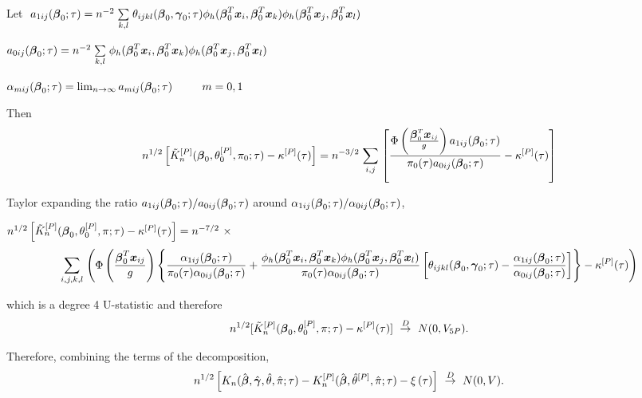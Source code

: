\documentclass[12pt]{article}
\newcommand{\bmx}{\mbox{\boldmath $x$}}
\newcommand{\bg}{\mbox{\boldmath $\gamma$}}
\newcommand{\bb}{\mbox{\boldmath $\beta$}}
\def\stackunder#1#2{\mathrel{\mathop{#2}\limits_{#1}}}
\begin{document}
\bigskip

\noindent \hspace{0.50in} Let $ \ a_{1ij}(\bb_0;\tau) = n^{-2} \stackunder{k, l}{\sum} \theta_{ijkl}(\bb_0,\bg_0;\tau) \phi_h(\bb_0^T\bmx_{i},\bb_0^T\bmx_{k}) \phi_h(\bb_0^T\bmx_{j},\bb_0^T\bmx_{l})$

\noindent \hspace{0.85in}  $a_{0ij}(\bb_0;\tau) = n^{-2} \stackunder{k, l}{\sum} \phi_h(\bb_0^T\bmx_{i},\bb_0^T\bmx_{k}) \phi_h(\bb_0^T\bmx_{j},\bb_0^T\bmx_{l}) $

\noindent \hspace{0.85in}  $\alpha_{mij}(\bb_0;\tau) = \lim_{n \rightarrow \infty} a_{mij}(\bb_0;\tau) \ \ \ \ \ \ \ \ m=0,1$


\bigskip

\noindent Then 
\[ n^{1/2}\left[ \tilde{K}_n^{[P]}(\bb_0, \theta^{[P]}_0,\pi_0;\tau) - \kappa^{[P]}(\tau) \right] = 
n^{-3/2} \stackunder{i, j }{\sum} \left[ \frac{\Phi \left(\frac{\bb_0^T\bmx_{ij} }{g} \right) a_{1ij}(\bb_0;\tau)}{\pi_0(\tau)  a_{0ij}(\bb_0;\tau)} - \kappa^{[P]}(\tau) \right] \]

\vskip 0.25in
\noindent Taylor expanding the ratio $a_{1ij}(\bb_0;\tau)/a_{0ij}(\bb_0;\tau)$ around $\alpha_{1ij}(\bb_0;\tau)/\alpha_{0ij}(\bb_0;\tau)$,

\bigskip

\small 
\noindent $n^{1/2}\left[ \tilde{K}_n^{[P]}(\bb_0, \theta^{[P]}_0,\pi;\tau) - \kappa^{[P]}(\tau) \right] = n^{-7/2}  \ \times $ \footnotesize
\[  \stackunder{i, j, k ,l }{\sum}  \left(\Phi \left(\frac{\bb_0^T\bmx_{ij} }{g} \right) \left\{ \frac{\alpha_{1ij}(\bb_0;\tau)}{\pi_0(\tau) \alpha_{0ij}(\bb_0;\tau)} + \frac{\phi_h(\bb_0^T\bmx_{i},\bb_0^T\bmx_{k}) \phi_h(\bb_0^T\bmx_{j},\bb_0^T\bmx_{l})}{\pi_0(\tau) \alpha_{0ij}(\bb_0;\tau)} \left[\theta_{ijkl}(\bb_0,\bg_0;\tau) - \frac{\alpha_{1ij}(\bb_0;\tau)}{\alpha_{0ij}(\bb_0;\tau)}\right] \right\} - \kappa^{[P]}(\tau) \right) \]

\normalsize
which is a degree 4 U-statistic and therefore
\[ n^{1/2}[\tilde{K}_n^{[P]}(\bb_0, \theta^{[P]}_0,\pi;\tau) - \kappa^{[P]}(\tau)] \ \stackrel{D}{\rightarrow} \ N(0, V_{5P}) .\] 
 

\bigskip

\noindent Therefore, combining the terms of the decomposition,
\[ n^{1/2} \left[K_n (\hat{\bb},\hat{\bg}, \hat{\theta},\hat{\pi};\tau) - K_n^{[P]}(\hat{\bb}, \hat{\theta}^{[P]},\hat{\pi};\tau) - \xi \left(\tau \right) \right]  \ \stackrel{D}{\rightarrow} \ N(0, V) .\]
\end{document}

